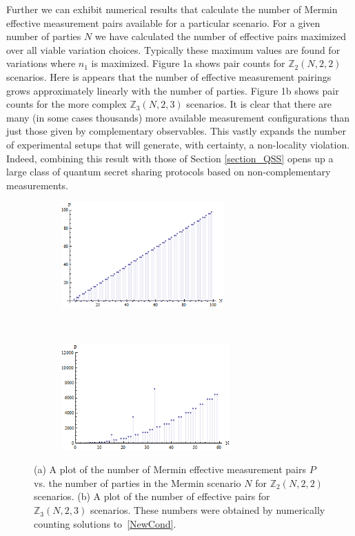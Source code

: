 Further we can exhibit numerical results that calculate the number of Mermin effective measurement pairs available for a particular scenario. For a given number of parties $N$ we have calculated the number of effective pairs maximized over all viable variation choices.  Typically these maximum values are found for variations where $n_1$ is maximized. Figure 1a shows pair counts for $\mathbb{Z}_2(N,2,2)$ scenarios. Here is appears that the number of effective measurement pairings grows approximately linearly with the number of parties. Figure 1b shows pair counts for the more complex $\mathbb{Z}_3(N,2,3)$ scenarios. It is clear that there are many (in some cases thousands) more available measurement configurations than just those given by complementary observables. This vastly expands the number of experimental setups that will generate, with certainty, a non-locality violation.  Indeed, combining this result with those of Section \ref{section_QSS} opens up a large class of quantum secret sharing protocols based on non-complementary measurements.

\begin{figure}[th]
    \label{counts}
    \centering
    \begin{subfigure}[t]{0.5\textwidth}
        \centering
        \includegraphics[height=1.6in]{images/countsA_2D}
        \caption{ }
    \end{subfigure}%
    ~ 
    \begin{subfigure}[t]{0.5\textwidth}
        \centering
        \includegraphics[height=1.6in]{images/counts_2D}
        \caption{ }
    \end{subfigure}
    \caption[Numerical counts of Mermin effective pairs.]{(a) A plot of the number of Mermin effective measurement pairs $P$ vs. the number of parties in the Mermin scenario $N$ for $\mathbb{Z}_2(N,2,2)$ scenarios. (b) A plot of the number of effective pairs for $\mathbb{Z}_3(N,2,3)$ scenarios. These numbers were obtained by numerically counting solutions to~\eqref{NewCond}.}
\end{figure}


